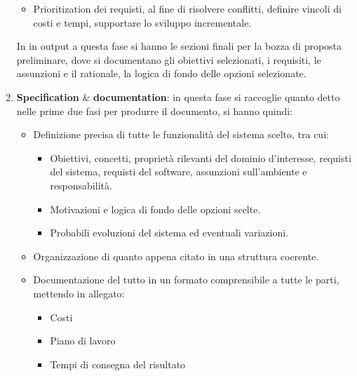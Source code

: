 \begin{enumerate}
\begin{itemize}
                  \item Prioritization dei requisti, al fine di risolvere
                        conflitti, definire vincoli di costi e tempi, supportare
                        lo sviluppo incrementale.
            \end{itemize}
            In in output a questa fase si hanno le sezioni finali per la bozza
            di proposta preliminare, dove si documentano gli obiettivi selezionati,
            i requisiti, le assunzioni e il rationale, la logica di fondo delle
            opzioni selezionate.
      \item \textbf{Specification} $\&$ \textbf{documentation}: in questa fase
            si raccoglie quanto detto nelle prime due fasi per produrre il
            documento, si hanno quindi:
            \begin{itemize}
                  \item Definizione precisa di tutte le funzionalità del sistema
                        scelto, tra cui:
                        \begin{itemize}
                              \item Obiettivi, concetti, proprietà rilevanti del
                                    dominio d'interesse, requisti del sistema,
                                    requisti del software, assunzioni sull'ambiente
                                    e responsabilità.
                              \item Motivazioni e logica di fondo delle opzioni
                                    scelte.
                              \item Probabili evoluzioni del sistema ed eventuali
                                    variazioni.
                        \end{itemize}
                  \item Organizzazione di quanto appena citato in una struttura
                        coerente.
                  \item Documentazione del tutto in un formato comprensibile a
                        tutte le parti, mettendo in allegato:
                        \begin{itemize}
                              \item Costi
                              \item Piano di lavoro
                              \item Tempi di consegna del risultato
                        \end{itemize}

\end{itemize}
\end{enumerate}
